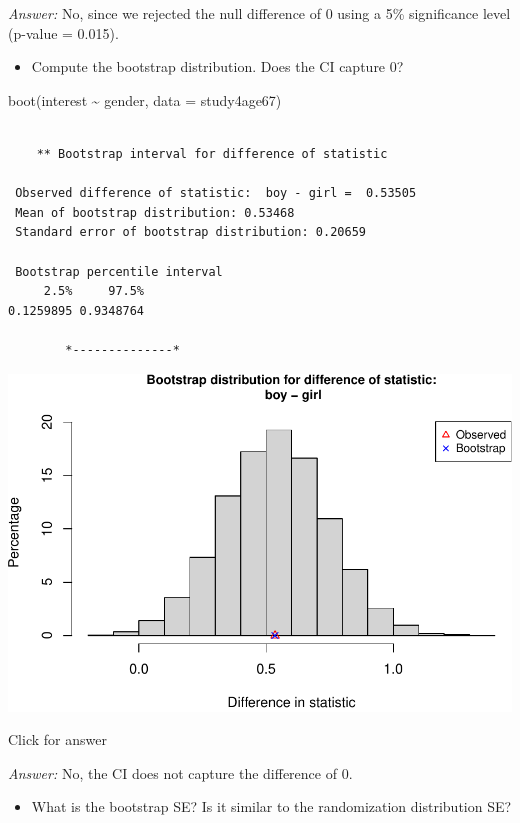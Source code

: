 \documentclass[
]{book}
\newenvironment{Shaded}{\begin{snugshade}}{\end{snugshade}}
\newcommand{\AttributeTok}[1]{\textcolor[rgb]{0.77,0.63,0.00}{#1}}
\newcommand{\FunctionTok}[1]{\textcolor[rgb]{0.00,0.00,0.00}{#1}}
\newcommand{\NormalTok}[1]{#1}
\newcommand{\SpecialCharTok}[1]{\textcolor[rgb]{0.00,0.00,0.00}{#1}}
\providecommand{\tightlist}{%
  \setlength{\itemsep}{0pt}\setlength{\parskip}{0pt}}
\begin{document}
\emph{Answer:} No, since we rejected the null difference of 0 using a 5\% significance level (p-value = 0.015).

\begin{itemize}
\tightlist
\item
  Compute the bootstrap distribution. Does the CI capture 0?
\end{itemize}

\begin{Shaded}
\begin{Highlighting}[]
\FunctionTok{boot}\NormalTok{(interest }\SpecialCharTok{\textasciitilde{}}\NormalTok{ gender, }\AttributeTok{data =}\NormalTok{ study4age67)}
\end{Highlighting}
\end{Shaded}

\begin{verbatim}

    ** Bootstrap interval for difference of statistic

 Observed difference of statistic:  boy - girl =  0.53505 
 Mean of bootstrap distribution: 0.53468 
 Standard error of bootstrap distribution: 0.20659 

 Bootstrap percentile interval
     2.5%     97.5% 
0.1259895 0.9348764 

        *--------------*
\end{verbatim}

\includegraphics[width=1\linewidth]{Class_Activity_14_files/figure-latex/unnamed-chunk-9-1}

Click for answer

\emph{Answer:} No, the CI does not capture the difference of 0.

\begin{itemize}
\tightlist
\item
  What is the bootstrap SE? Is it similar to the randomization distribution SE?
\end{itemize}
\end{document}
